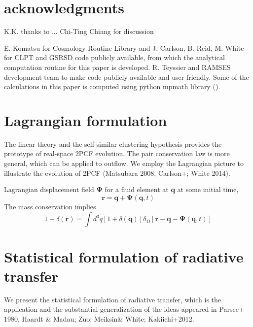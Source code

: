 \documentclass[useAMS,usenatbib,twocolumn]{mn2e}
\begin{document}
 


\bigskip
\section*{acknowledgments}

K.K. thanks to ...
Chi-Ting Chiang for discussion

E. Komatsu for Cosmology Routine Library and J. Carlson, B. Reid, M. White
for CLPT and GSRSD code publicly available, from which the analytical
computation routine for this paper is developed.
R. Teyssier and RAMSES development team to make code publicly available
and user friendly.
Some of the calculations in this paper is computed using 
python mpmath library (\citealt{mpmath}).






\appendix

\section{Lagrangian formulation}
The linear theory and the self-similar clustering hypothesis provides
the prototype of real-space 2PCF evolution. The pair conservation law is
more general, which can be applied to outflow. We employ the Lagrangian
picture to illustrate the evolution of 2PCF (Matsubara 2008, Carlson+;
White 2014). 

Lagrangian displacement field $\boldsymbol{\Psi}$ for a fluid element
at $\boldsymbol{q}$ at some initial time,
\begin{equation}
\boldsymbol{r}=\boldsymbol{q}+\boldsymbol{\Psi}(\boldsymbol{q},t)
\end{equation}
The mass conservation implies
\begin{equation}
1+\delta(\boldsymbol{r})=\int d^3q[1+\delta(\boldsymbol{q})]
\delta_D[\boldsymbol{r}-\boldsymbol{q}-\boldsymbol{\Psi}(\boldsymbol{q},t)]
\end{equation}


\section{Statistical formulation of radiative transfer}\label{appendix}
We present the statistical formulation of radiative transfer, which is
the application and the substantial generalization of the ideas appeared 
in Parsce+ 1980, Haardt \& Madau; Zuo; Meiksin\& White; Kakiichi+2012.
\end{document}
